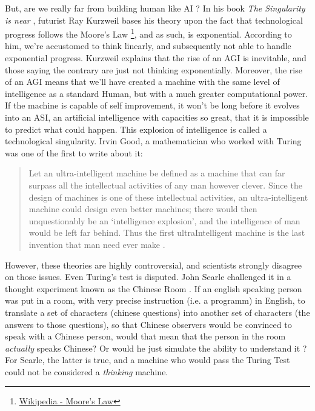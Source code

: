 \documentclass[12pt]{article}
\begin{document}
But, are we really far from building human like AI ? In his book {\em The
Singularity is near} \cite{Kurzweil}, futurist Ray Kurzweil bases his theory
upon the fact that technological progress follows the Moore's Law
\footnote{\href{https://en.wikipedia.org/wiki/Moore\%27s_law} {Wikipedia -
Moore's Law} }, and as such, is exponential. According to him, we're accustomed
to think linearly, and subsequently not able to handle exponential progress.
Kurzweil explains that the rise of an \gls{AGI} is inevitable, and those saying
the contrary are just not thinking exponentially. Moreover, the rise of an
\gls{AGI} means that we'll have created a machine with the same level of
intelligence as a standard Human, but with a much greater computational power.
If the machine is capable of self improvement, it won't be long before it
evolves into an \gls{ASI}, an artificial intelligence with capacities so great,
that it is impossible to predict what could happen. This explosion of
intelligence is called a technological singularity. Irvin Good, a mathematician
who worked with Turing was one of the first to write about it: \\

\smallskip

\begin{quotation}
   Let an ultra-intelligent machine be defined as a machine that can far surpass
   all the intellectual activities of any man however clever. Since the design
   of machines is one of these intellectual activities, an ultra-intelligent
   machine could design even better machines; there would then unquestionably be
   an \lq intelligence explosion\rq , and the intelligence of man would be left
   far behind. Thus the first ultraIntelligent machine is the last invention
   that man need ever make \cite{Good}.
\end{quotation}

However, these theories are highly controversial, and scientists strongly
disagree on those issues. Even Turing's test is disputed. John Searle challenged
it in a thought experiment known as the Chinese Room \cite{ChineseRoom}. If an
english speaking person was put in a room, with very precise instruction (i.e. a
programm) in English, to translate a set of characters (chinese questions) into
another set of characters (the answers to those questions), so that Chinese
observers would be convinced to speak with a Chinese person, would that mean
that the person in the room {\em actually} speaks Chinese? Or would he just
simulate the ability to understand it ? For Searle, the latter is true, and a
machine who would pass the Turing Test could not be considered a {\em thinking}
machine. \\
\end{document}
